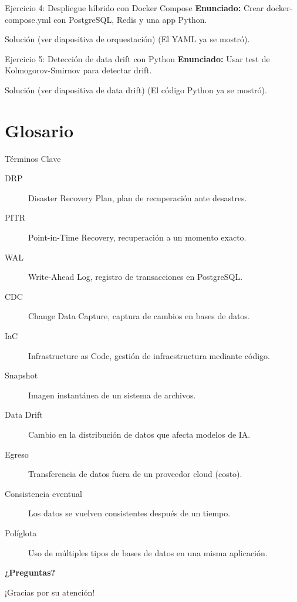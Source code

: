 \documentclass[aspectratio=169, 10pt, xcolor=table]{beamer}
\begin{document}
\begin{frame}[fragile]{Ejercicio 4: Despliegue híbrido con Docker Compose}
    \textbf{Enunciado:} Crear docker-compose.yml con PostgreSQL, Redis y una app Python.
    \begin{block}{Solución (ver diapositiva de orquestación)}
        (El YAML ya se mostró).
    \end{block}
\end{frame}

\begin{frame}[fragile]{Ejercicio 5: Detección de data drift con Python}
    \textbf{Enunciado:} Usar test de Kolmogorov-Smirnov para detectar drift.
    \begin{block}{Solución (ver diapositiva de data drift)}
        (El código Python ya se mostró).
    \end{block}
\end{frame}

\section{Glosario}

\begin{frame}{Términos Clave}
    \begin{description}
        \item[DRP] Disaster Recovery Plan, plan de recuperación ante desastres.
        \item[PITR] Point-in-Time Recovery, recuperación a un momento exacto.
        \item[WAL] Write-Ahead Log, registro de transacciones en PostgreSQL.
        \item[CDC] Change Data Capture, captura de cambios en bases de datos.
        \item[IaC] Infrastructure as Code, gestión de infraestructura mediante código.
        \item[Snapshot] Imagen instantánea de un sistema de archivos.
        \item[Data Drift] Cambio en la distribución de datos que afecta modelos de IA.
        \item[Egreso] Transferencia de datos fuera de un proveedor cloud (costo).
        \item[Consistencia eventual] Los datos se vuelven consistentes después de un tiempo.
        \item[Políglota] Uso de múltiples tipos de bases de datos en una misma aplicación.
    \end{description}
\end{frame}

\begin{frame}
    \centering
    \Huge \textbf{¿Preguntas?}
    
    \vspace{1cm}
    \large ¡Gracias por su atención!
\end{frame}
\end{document}
